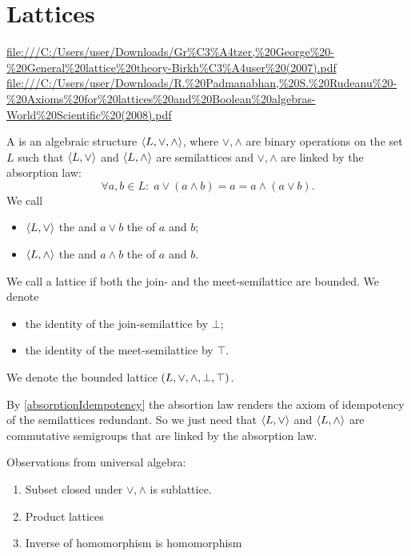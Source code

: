 \section{Lattices}
\url{file:///C:/Users/user/Downloads/Gr%C3%A4tzer,%20George%20-%20General%20lattice%20theory-Birkh%C3%A4user%20(2007).pdf}
\url{file:///C:/Users/user/Downloads/R.%20Padmanabhan,%20S.%20Rudeanu%20-%20Axioms%20for%20lattices%20and%20Boolean%20algebras-World%20Scientific%20(2008).pdf}
\begin{definition}
A  is an algebraic structure $\langle L,\vee, \wedge \rangle$, where $\vee, \wedge$ are binary operations on the set $L$ such that $\langle L,\vee \rangle$ and $\langle L,\wedge \rangle$ are semilattices and $\vee,\wedge$ are linked by the absorption law:
\[ \forall a,b\in L: \; a \vee (a \wedge b) = a = a \wedge (a\vee b). \]
We call
\begin{itemize}
\item $\langle L,\vee \rangle$ the  and $a\vee b$ the  of $a$ and $b$;
\item $\langle L,\wedge \rangle$ the  and $a\wedge b$ the  of $a$ and $b$.
\end{itemize}
We call a lattice  if both the join- and the meet-semilattice are bounded. We denote
\begin{itemize}
\item the identity of the join-semilattice by $\bot$;
\item the identity of the meet-semilattice by $\top$.
\end{itemize}
We denote the bounded lattice $\left( L, \vee, \wedge, \bot, \top \right)$.
\end{definition}
By \ref{absorptionIdempotency} the absortion law renders the axiom of  idempotency of the semilattices redundant. So we just need that $\langle L,\vee \rangle$ and $\langle L,\wedge \rangle$ are commutative semigroups that are linked by the absorption law.

\begin{proposition}
Observations from universal algebra:
\begin{enumerate}
\item Subset closed under $\vee,\wedge$ is sublattice.
\item Product lattices
\item Inverse of homomorphism is homomorphism
\end{enumerate}
\end{proposition}


